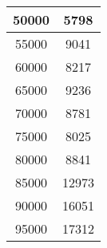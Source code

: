 \begin{table}[h!]
\begin{tabular}{cc}
\multicolumn{1}{|c|}{50000}                        & \multicolumn{1}{c|}{5798}                                                                                                                                     \\ \hline
\multicolumn{1}{|c|}{55000}                        & \multicolumn{1}{c|}{9041}                                                                                                                                     \\ \hline
\multicolumn{1}{|c|}{60000}                        & \multicolumn{1}{c|}{8217}                                                                                                                                     \\ \hline
\multicolumn{1}{|c|}{65000}                        & \multicolumn{1}{c|}{9236}                                                                                                                                     \\ \hline
\multicolumn{1}{|c|}{70000}                        & \multicolumn{1}{c|}{8781}                                                                                                                                     \\ \hline
\multicolumn{1}{|c|}{75000}                        & \multicolumn{1}{c|}{8025}                                                                                                                                     \\ \hline
\multicolumn{1}{|c|}{80000}                        & \multicolumn{1}{c|}{8841}                                                                                                                                     \\ \hline
\multicolumn{1}{|c|}{85000}                        & \multicolumn{1}{c|}{12973}                                                                                                                                     \\ \hline
\multicolumn{1}{|c|}{90000}                        & \multicolumn{1}{c|}{16051}                                                                                                                                     \\ \hline
\multicolumn{1}{|c|}{95000}                        & \multicolumn{1}{c|}{17312}                                                                                                                                     \\ \hline

\end{tabular}
\end{table}
